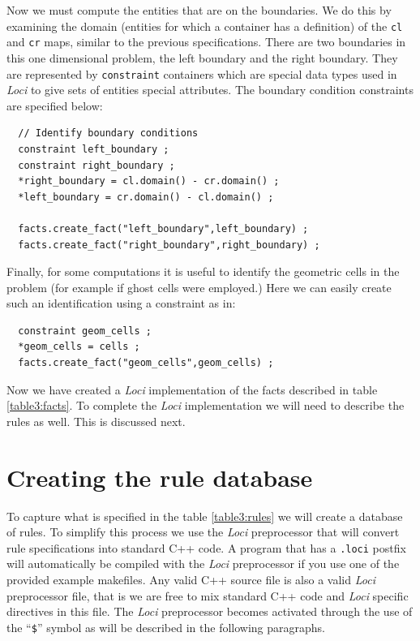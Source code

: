 \documentclass[10pt,epsf,letterpaper,twoside]{book}
\begin{document}
Now we must compute the entities that are on the boundaries.  We do
this by examining the domain (entities for which a container has a
definition) of the {\tt cl} and {\tt cr} maps, similar to the previous
specifications.  There are two boundaries in this one dimensional
problem, the left boundary and the right boundary.  They are
represented by {\tt constraint} containers which are special data
types used in {\it Loci} to give sets of entities special attributes.  The
boundary condition constraints are specified below:
\begin{verbatim}
  // Identify boundary conditions
  constraint left_boundary ;
  constraint right_boundary ;
  *right_boundary = cl.domain() - cr.domain() ;
  *left_boundary = cr.domain() - cl.domain() ;

  facts.create_fact("left_boundary",left_boundary) ;
  facts.create_fact("right_boundary",right_boundary) ;
\end{verbatim}
Finally, for some computations it is useful to identify the geometric
cells in the problem (for example if ghost cells were employed.)  Here
we can easily create such an identification using a constraint as in:
\begin{verbatim}
  constraint geom_cells ;
  *geom_cells = cells ;
  facts.create_fact("geom_cells",geom_cells) ;
\end{verbatim}

Now we have created a {\it Loci} implementation of the facts described in
table \ref{table3:facts}.  To complete the {\it Loci} implementation we will
need to describe the rules as well.  This is discussed next.

\section{Creating the rule database}

To capture what is specified in the table \ref{table3:rules} we will
create a database of rules.  To simplify this process we use the {\it
  Loci} preprocessor that will convert rule specifications into
standard C++ code.  A program that has a {\tt .loci} postfix will
automatically be compiled with the {\it Loci} preprocessor if you use
one of the provided example makefiles.  Any valid C++ source file is
also a valid {\it Loci} preprocessor file, that is we are free to mix
standard C++ code and {\it Loci} specific directives in this file.
The {\it Loci} preprocessor becomes activated through the use of the
``{\tt \$}'' symbol as will be described in the following paragraphs.
\end{document}
